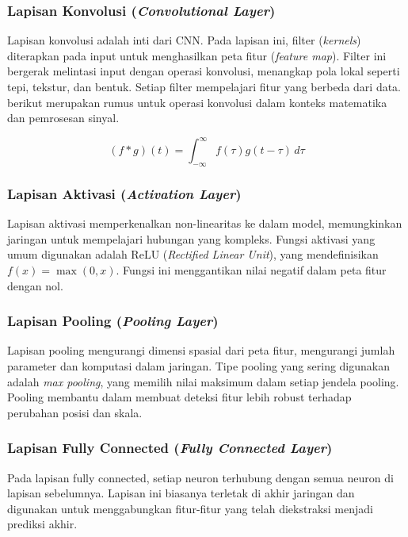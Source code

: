 \subsubsection{Lapisan Konvolusi (\emph{Convolutional Layer})}

Lapisan konvolusi adalah inti dari CNN. Pada lapisan ini, filter (\emph{kernels}) diterapkan pada input untuk menghasilkan peta fitur (\emph{feature map}). Filter ini bergerak melintasi input dengan operasi konvolusi, menangkap pola lokal seperti tepi, tekstur, dan bentuk. Setiap filter mempelajari fitur yang berbeda dari data. berikut merupakan rumus untuk operasi konvolusi dalam konteks matematika dan pemrosesan sinyal.

\begin{equation}
    (f * g)(t) = \int_{-\infty}^{\infty} f(\tau)g(t - \tau) \, d\tau
\end{equation}

\subsubsection{Lapisan Aktivasi (\emph{Activation Layer})}

Lapisan aktivasi memperkenalkan non-linearitas ke dalam model, memungkinkan jaringan untuk mempelajari hubungan yang kompleks. Fungsi aktivasi yang umum digunakan adalah ReLU (\emph{Rectified Linear Unit}), yang mendefinisikan \( f(x) = \max(0, x) \). Fungsi ini menggantikan nilai negatif dalam peta fitur dengan nol.

\subsubsection{Lapisan Pooling (\emph{Pooling Layer})}

Lapisan pooling mengurangi dimensi spasial dari peta fitur, mengurangi jumlah parameter dan komputasi dalam jaringan. Tipe pooling yang sering digunakan adalah \emph{max pooling}, yang memilih nilai maksimum dalam setiap jendela pooling. Pooling membantu dalam membuat deteksi fitur lebih robust terhadap perubahan posisi dan skala.

\subsubsection{Lapisan Fully Connected (\emph{Fully Connected Layer})}

Pada lapisan fully connected, setiap neuron terhubung dengan semua neuron di lapisan sebelumnya. Lapisan ini biasanya terletak di akhir jaringan dan digunakan untuk menggabungkan fitur-fitur yang telah diekstraksi menjadi prediksi akhir. 

